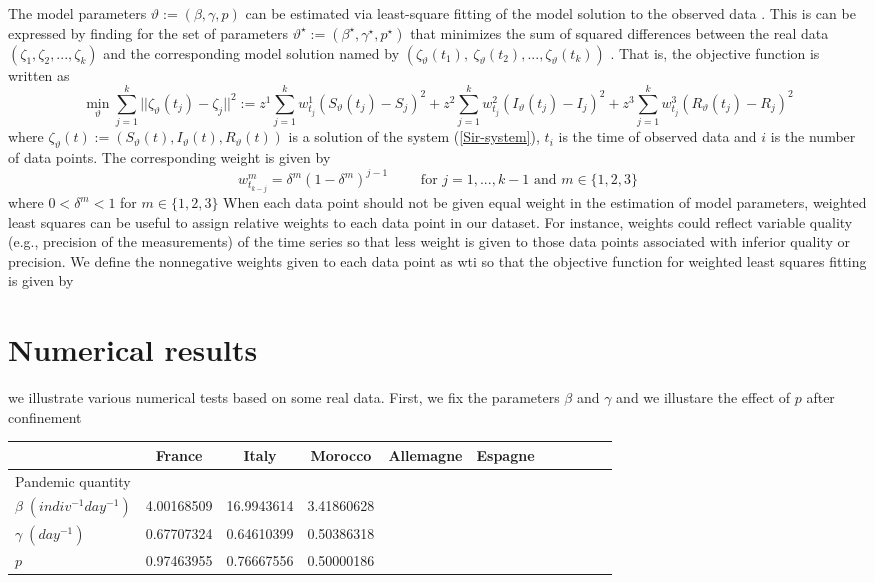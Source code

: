 \documentclass[final,a4paper,reqno]{elsarticle}
\numberwithin{equation}{section}
\begin{document}
The model parameters  $\vartheta :=(\beta, \gamma,p)$  can be estimated via least-square fitting of the model solution to the observed data \cite{BT}. This is can be expressed  by finding for the set of parameters $\vartheta^\star :=(\beta^\star, \gamma^\star,p^\star)$ that minimizes the sum of squared differences between the  real data $(\zeta_1,\zeta_2,...,\zeta_k)$ and the corresponding model solution named by $( \zeta_\vartheta(t_1), \:\zeta_\vartheta(t_2),..., \zeta_\vartheta(t_k))$ . That is, the objective function is written  as  
$$\min_{\vartheta} \sum_{j=1}^k ||\zeta_\vartheta(t_j)-\zeta_{j} ||^2 := z^1\sum_{j=1}^k w^1_{t_j}(S_\vartheta(t_j)-S_j)^2+z^2\sum_{j=1}^k w^2_{t_j} (I_\vartheta(t_j)-I_j)^2+z^3\sum_{j=1}^k w^3_{t_j} (R_\vartheta(t_j)-R_j)^2$$ 
where $ \zeta_\vartheta(t):=(S_\vartheta(t),I_\vartheta(t),R_\vartheta(t))$  is a solution of  the system  (\ref{Sir-system}),
 $t_i$ is the time of observed data and $i$ is the number of data points. The corresponding weight  is given by
 $$ w^m_{t_{k-j}}= \delta^m(1-\delta^m)^{j-1} \qquad \mbox{ for }  j=1,...,k-1  \mbox{ and } m\in \{1,2,3\} $$
 where $0<\delta^m<1$  for $m\in \{1,2,3\} $
When each data point should not be given equal weight in the estimation of model parameters, weighted least squares can
be useful to assign relative weights to each data point in our dataset. For instance, weights could reflect variable quality (e.g.,
precision of the measurements) of the time series so that less weight is given to those data points associated with inferior
quality or precision. We define the nonnegative weights given to each data point as wti so that the objective function for
weighted least squares fitting is given by






\section{Numerical results}
we illustrate various numerical tests based on some real data. First, we fix the parameters $\beta$ and $\gamma$ and we illustare the effect of $p$ after confinement 
\begin{table}[h]
	\centering
	\begin{tabular}{|l| c| c | c | c l c l cll}
		\hline
		$\qquad$  & France & Italy & Morocco & Allemagne & Espagne   \\
		 \hline
		Pandemic quantity & $\qquad$  &$\qquad$ &$\qquad$ &$\qquad$ & \\
		\hline
		$\beta \; (indiv^{-1}day^{-1})$ & 4.00168509 & 16.9943614 & 3.41860628 & & \\
		$\gamma \; (day^{-1})$ & 0.67707324  & 0.64610399 & 0.50386318 & &  \\
		$p$& 0.97463955 & 0.76667556 & 0.50000186 & &  \\
				\hline		
	\end{tabular}
\end{table}
\end{document}
